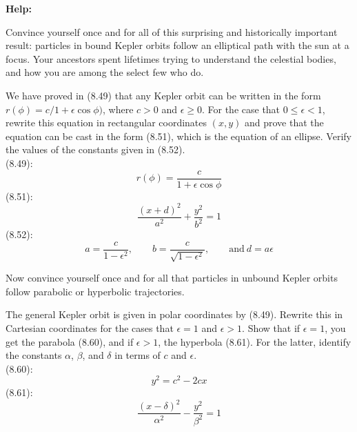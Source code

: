 \documentclass[11pt,letterpaper,boxed]{../hmcpsetrhino}
\begin{document}
\textbf{Help:} 

\begin{problem}[i]
Convince yourself once and for all of this surprising and historically important result: particles in bound Kepler orbits follow an elliptical path with the sun at a focus. Your ancestors spent lifetimes trying to understand the celestial bodies, and how you are among the select few who do.

\begin{problem}[8.16]
We have proved in (8.49) that any Kepler orbit can be written in the form $r(\phi) = c/1 + \epsilon \cos \phi)$, where $c>0$ and $\epsilon \geq 0$. For the case that $0 \leq \epsilon <1$, rewrite this equation in rectangular coordinates $(x,y)$ and prove that the equation can be cast in the form (8.51), which is the equation of an ellipse. Verify the values of the constants given in (8.52).\\
(8.49):
\[	r(\phi) = \frac{c}{1 + \epsilon \cos \phi}\]
(8.51):
\[	\frac{(x+d)^2}{a^2} + \frac{y^2}{b^2} = 1\]
(8.52): 
\[	a = \frac{c}{1 - \epsilon^2}, \qquad b = \frac{c}{\sqrt{1 - \epsilon^2}}, \qquad \text{and} \  d = a \epsilon\]
\end{problem}
\end{problem}
\begin{solution}


\vfill
\end{solution}

\newpage 

\begin{problem}[ii]
Now convince yourself once and for all that particles in unbound Kepler orbits follow parabolic or hyperbolic trajectories.

\begin{problem}[8.30]
The general Kepler orbit is given in polar coordinates by (8.49). Rewrite this in Cartesian coordinates for the cases that $\epsilon = 1$ and $\epsilon > 1$. Show that if $\epsilon = 1$, you get the parabola (8.60), and if $\epsilon >1$, the hyperbola (8.61). For the latter, identify the constants $\alpha$, $\beta$, and $\delta$ in terms of $c$ and $\epsilon$.\\

(8.60):
\[	y^2 =c^2 - 2cx\]
(8.61):
\[	\frac{(x-\delta)^2}{\alpha^2} - \frac{y^2}{\beta^2} = 1\]
\end{problem}
\end{problem}
\begin{solution}


\vfill
\end{solution}
\end{document}
